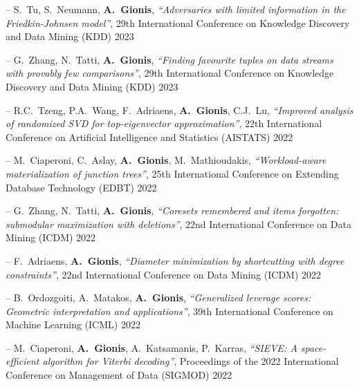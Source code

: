 \documentclass[a4paper,11pt]{article}
\begin{document}
\item[--] 
{S.\ Tu, S.\ Neumann, \textbf{A.\ Gionis}},
{\em ``Adversaries with limited information in the Friedkin-Johnsen model''},
29th International Conference on Knowledge Discovery and Data Mining (KDD) 2023

\item[--] 
{G.\ Zhang, N.\ Tatti, \textbf{A.\ Gionis}},
{\em ``Finding favourite tuples on data streams with provably few comparisons''},
29th International Conference on Knowledge Discovery and Data Mining (KDD) 2023

\item[--] 
{R.C.\ Tzeng, P.A.\ Wang, F.\ Adriaens, \textbf{A.\ Gionis}, C.J.\ Lu},
{\em ``Improved analysis of randomized SVD for top-eigenvector approximation''},
22th International Conference on Artificial Intelligence and Statistics (AISTATS) 2022

\item[--] 
{M.\ Ciaperoni, C.\ Aslay, \textbf{A.\ Gionis}, M.\ Mathioudakis},
{\em ``Workload-aware materialization of junction trees''},
25th International Conference on Extending Database Technology (EDBT) 2022


\item[--] 
{G.\ Zhang, N.\ Tatti, \textbf{A.\ Gionis}},
{\em ``Coresets remembered and items forgotten: submodular maximization with deletions''},
22nd International Conference on Data Mining (ICDM) 2022

\item[--] 
{F.\ Adriaens, \textbf{A.\ Gionis}},
{\em ``Diameter minimization by shortcutting with degree constraints''},
22nd International Conference on Data Mining (ICDM) 2022

\item[--] 
{B.\ Ordozgoiti, A.\ Matakos, \textbf{A.\ Gionis}},
{\em ``Generalized leverage scores: Geometric interpretation and applications''},
39th International Conference on Machine Learning (ICML) 2022

\item[--] 
{M.\ Ciaperoni, \textbf{A.\ Gionis}, A.\ Katsamanis, P.\ Karras},
{\em ``SIEVE: A space-efficient algorithm for Viterbi decoding''},
Proceedings of the 2022 International Conference on Management of Data (SIGMOD) 2022
\end{document}
